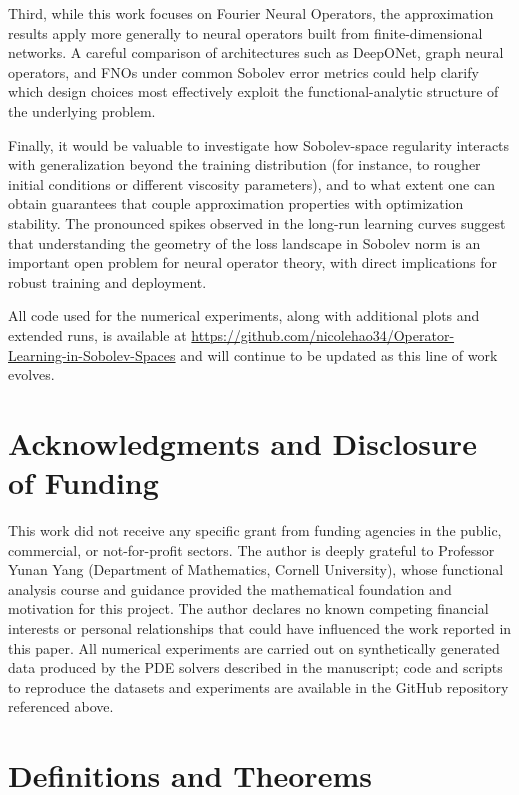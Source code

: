 \documentclass[11pt]{article}
\theoremstyle{plain}
\theoremstyle{definition}
\theoremstyle{remark}
\begin{document}
Third, while this work focuses on Fourier Neural Operators, the approximation
results apply more generally to neural operators built from finite-dimensional
networks. A careful comparison of architectures such as DeepONet, graph neural
operators, and FNOs under common Sobolev error metrics could help clarify
which design choices most effectively exploit the functional-analytic
structure of the underlying problem.

Finally, it would be valuable to investigate how Sobolev-space regularity
interacts with generalization beyond the training distribution (for instance,
to rougher initial conditions or different viscosity parameters), and to what
extent one can obtain guarantees that couple approximation properties with
optimization stability. The pronounced spikes observed in the long-run
learning curves suggest that understanding the geometry of the loss landscape
in Sobolev norm is an important open problem for neural operator theory, with
direct implications for robust training and deployment.

All code used for the numerical experiments, along with additional plots and
extended runs, is available at
\url{https://github.com/nicolehao34/Operator-Learning-in-Sobolev-Spaces} and
will continue to be updated as this line of work evolves.

\section*{Acknowledgments and Disclosure of Funding}
This work did not receive any specific grant from funding agencies in
the public, commercial, or not-for-profit sectors. The author is deeply
grateful to Professor Yunan Yang (Department of Mathematics, Cornell
University), whose functional analysis course and guidance provided the
mathematical foundation and motivation for this project. The author declares
no known competing financial interests or personal relationships that could
have influenced the work reported in this paper. All numerical experiments are
carried out on synthetically generated data produced by the PDE solvers
described in the manuscript; code and scripts to reproduce the datasets and
experiments are available in the GitHub repository referenced above.

\vskip 0.2in



\newpage
\appendix
\section{Definitions and Theorems}
\label{app:defs}
\end{document}
